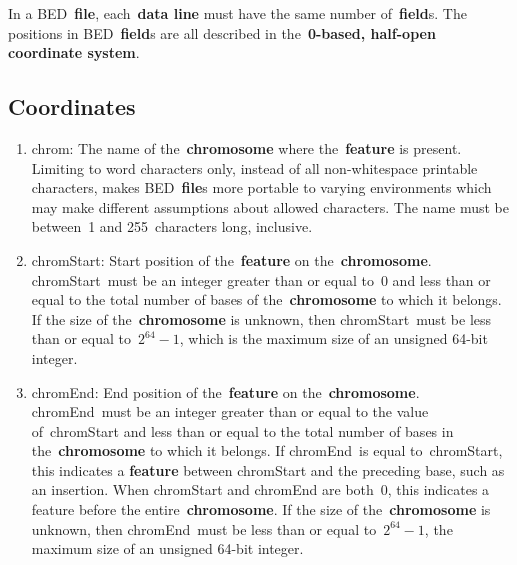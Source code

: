 \documentclass[11pt]{article}
\begin{document}
In a \ac{BED}~\textbf{file}, each~\textbf{data line} must have the same number of~\textbf{field}s.
The positions in \ac{BED}~\textbf{field}s are all described in the~\textbf{0-based, half-open coordinate system}.

\subsection{Coordinates}
\begin{enumerate}
\item \textsf{chrom}: The name of the~\textbf{chromosome} where the~\textbf{feature} is present.
  Limiting to word characters only, instead of all non-whitespace printable characters, makes \ac{BED}~\textbf{file}s more portable to varying environments which may make different assumptions about allowed characters.
  The name must be between~1 and 255~characters long, inclusive.

\item \textsf{chromStart}: Start position of the~\textbf{feature} on the~\textbf{chromosome}.
  \textsf{chromStart}~must be an integer greater than or equal to~0 and less than or equal to the total number of bases of the~\textbf{chromosome} to which it belongs.
  If the size of the~\textbf{chromosome} is unknown, then \textsf{chromStart}~must be less than or equal to~$2^{64} - 1$, which is the maximum size of an unsigned 64-bit integer.

\item \textsf{chromEnd}: End position of the~\textbf{feature} on the~\textbf{chromosome}.
  \textsf{chromEnd}~must be an integer greater than or equal to the value of~\textsf{chromStart} and less than or equal to the total number of bases in the~\textbf{chromosome} to which it belongs.
  If \textsf{chromEnd}~is equal to~\textsf{chromStart}, this indicates a \textbf{feature} between \textsf{chromStart} and the preceding base, such as an insertion.
  When \textsf{chromStart} and \textsf{chromEnd} are both~0, this indicates a feature before the entire~\textbf{chromosome}.
  If the size of the~\textbf{chromosome} is unknown, then \textsf{chromEnd}~must be less than or equal to~$2^{64} - 1$, the maximum size of an unsigned 64-bit integer.
\end{enumerate}
\end{document}
